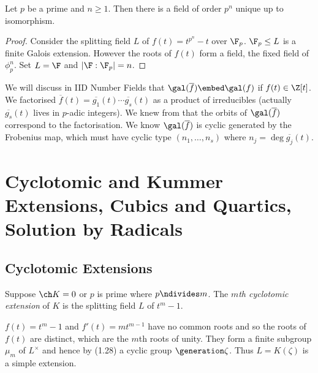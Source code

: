 \documentclass[a4paper]{article}
\newcommand*{\red}[1]{\overline{#1}}
\begin{document}
\begin{theorem}
  Let \(p\) be a prime and \(n \geq 1\). Then there is a field of order \(p^n\) unique up to isomorphism.
\end{theorem}

\begin{proof}
  Consider the splitting field \(L\) of \(f(t) = t^{p^n} - t\) over \(\F_p\). \(\F_p \leq L\) is a finite Galois extension. However the roots of \(f(t)\) form a field, the fixed field of \(\phi_p^n\). Set \(L = \F\) and \(|\F:\F_p| = n\).
\end{proof}

\begin{remark}
  \label{rmk:mod p reduction}
  We will discuss in IID Number Fields that \(\gal(\red f) \embed \gal(f)\) if \(f(t) \in \Z[t]\). We factorised \(\red f(t) = \red{g_1}(t)\cdots \red{g_s}(t)\) as a product of irreducibles (actually \(\red{g_s}(t)\) lives in \(p\)-adic integers). We knew from  that the orbits of \(\gal(\red f)\) correspond to the factorisation. We know \(\gal(\red f)\) is cyclic generated by the Frobenius map, which must have cyclic type \((n_1, \dots, n_s)\) where \(n_j = \deg \red{g_j}(t)\).
\end{remark}

\section{Cyclotomic and Kummer Extensions, Cubics and Quartics, Solution by Radicals}

\subsection{Cyclotomic Extensions}

\begin{definition}
  Suppose \(\ch K = 0\) or \(p\) is prime where \(p \ndivides m\). The \emph{\(m\)th cyclotomic extension} of \(K\) is the splitting field \(L\) of \(t^m - 1\).
\end{definition}

\begin{remark}
  \(f(t) = t^m - 1\) and \(f'(t) = mt^{m - 1}\) have no common roots and so the roots of \(f(t)\) are distinct, which are the \(m\)th roots of unity. They form a finite subgroup \(\mu_m\) of \(L^\times\) and hence by (1.28)  a cyclic group \(\generation \zeta\). Thus \(L = K(\zeta)\) is a simple extension.
\end{remark}
\end{document}

